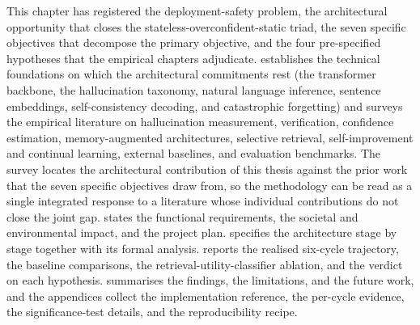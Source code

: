 This chapter has registered the deployment-safety problem, the architectural opportunity that closes the stateless-overconfident-static triad, the seven specific objectives that decompose the primary objective, and the four pre-specified hypotheses that the empirical chapters adjudicate.  establishes the technical foundations on which the architectural commitments rest (the transformer backbone, the hallucination taxonomy, natural language inference, sentence embeddings, self-consistency decoding, and catastrophic forgetting) and surveys the empirical literature on hallucination measurement, verification, confidence estimation, memory-augmented architectures, selective retrieval, self-improvement and continual learning, external baselines, and evaluation benchmarks. The survey locates the architectural contribution of this thesis against the prior work that the seven specific objectives draw from, so the methodology can be read as a single integrated response to a literature whose individual contributions do not close the joint gap.  states the functional requirements, the societal and environmental impact, and the project plan.  specifies the architecture stage by stage together with its formal analysis.  reports the realised six-cycle trajectory, the baseline comparisons, the retrieval-utility-classifier ablation, and the verdict on each hypothesis.  summarises the findings, the limitations, and the future work, and the appendices collect the implementation reference, the per-cycle evidence, the significance-test details, and the reproducibility recipe.